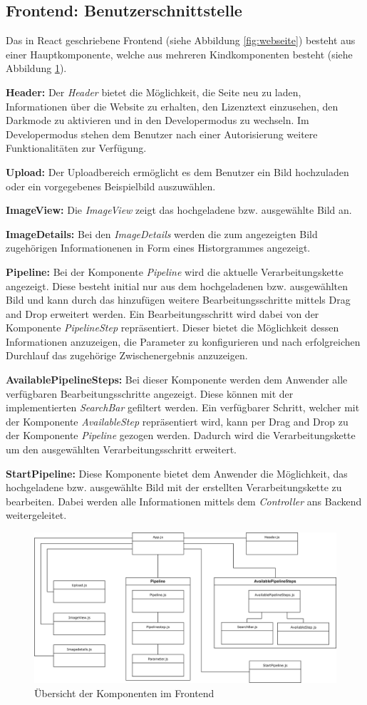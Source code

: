\subsection{Frontend: Benutzerschnittstelle}
Das in React geschriebene Frontend (siehe Abbildung \ref{fig:webseite}) besteht aus einer Hauptkomponente, welche aus mehreren Kindkomponenten besteht (siehe Abbildung \ref{fig:frontend}).

\textbf{Header:} Der \textit{Header} bietet die Möglichkeit, die Seite neu zu laden, Informationen über die Website zu erhalten, den Lizenztext einzusehen, den Darkmode zu aktivieren und in den Developermodus zu wechseln. Im Developermodus stehen dem Benutzer nach einer Autorisierung weitere Funktionalitäten zur Verfügung.

\textbf{Upload:} Der Uploadbereich ermöglicht es dem Benutzer ein Bild hochzuladen oder ein vorgegebenes Beispielbild auszuwählen.

\textbf{ImageView:} Die \textit{ImageView} zeigt das hochgeladene bzw. ausgewählte Bild an.

\textbf{ImageDetails:} Bei den \textit{ImageDetails} werden die zum angezeigten Bild zugehörigen Informationenen in Form eines Historgrammes angezeigt.

\textbf{Pipeline:} Bei der Komponente \textit{Pipeline} wird die aktuelle Verarbeitungskette angezeigt. Diese besteht initial nur aus dem hochgeladenen bzw. ausgewählten Bild und kann durch das hinzufügen weitere Bearbeitungsschritte mittels Drag and Drop erweitert werden. Ein Bearbeitungsschritt wird dabei von der Komponente \textit{PipelineStep} repräsentiert. Dieser bietet die Möglichkeit dessen Informationen anzuzeigen, die Parameter zu konfigurieren und nach erfolgreichen Durchlauf das zugehörige Zwischenergebnis anzuzeigen.

\textbf{AvailablePipelineSteps:} Bei dieser Komponente werden dem Anwender alle verfügbaren Bearbeitungsschritte angezeigt. Diese können mit der implementierten \textit{SearchBar} gefiltert werden. Ein verfügbarer Schritt, welcher mit der Komponente \textit{AvailableStep} repräsentiert wird, kann per Drag and Drop zu der Komponente \textit{Pipeline} gezogen werden. Dadurch wird die Verarbeitungskette um den ausgewählten Verarbeitungsschritt erweitert.

\textbf{StartPipeline:} Diese Komponente bietet dem Anwender die Möglichkeit, das hochgeladene bzw. ausgewählte Bild mit der erstellten Verarbeitungskette zu bearbeiten. Dabei werden alle Informationen mittels dem \textit{Controller} ans Backend weitergeleitet.

\begin{figure}[ht]
    \centering
    \includegraphics[width=\textwidth]{Bilder/FrontendBDCC.drawio.png}
    \caption{Übersicht der Komponenten im Frontend}
    \label{fig:frontend}
\end{figure}
